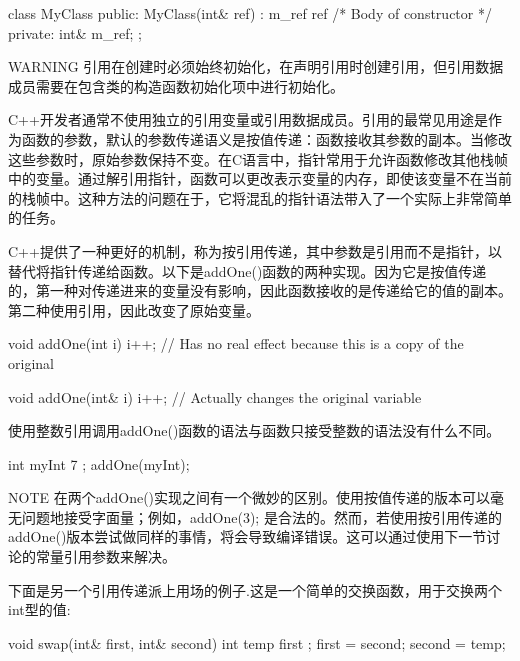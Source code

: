 \begin{cpp}
class MyClass
{
    public:
        MyClass(int& ref) : m_ref { ref } { /* Body of constructor */ }
    private:
        int& m_ref;
};
\end{cpp}

\begin{myWarning}{WARNING}
引用在创建时必须始终初始化，在声明引用时创建引用，但引用数据成员需要在包含类的构造函数初始化项中进行初始化。
\end{myWarning}


C++开发者通常不使用独立的引用变量或引用数据成员。引用的最常见用途是作为函数的参数，默认的参数传递语义是按值传递：函数接收其参数的副本。当修改这些参数时，原始参数保持不变。在C语言中，指针常用于允许函数修改其他栈帧中的变量。通过解引用指针，函数可以更改表示变量的内存，即使该变量不在当前的栈帧中。这种方法的问题在于，它将混乱的指针语法带入了一个实际上非常简单的任务。

C++提供了一种更好的机制，称为按引用传递，其中参数是引用而不是指针，以替代将指针传递给函数。以下是addOne()函数的两种实现。因为它是按值传递的，第一种对传递进来的变量没有影响，因此函数接收的是传递给它的值的副本。第二种使用引用，因此改变了原始变量。

\begin{cpp}
void addOne(int i)
{
    i++; // Has no real effect because this is a copy of the original
}

void addOne(int& i)
{
    i++; // Actually changes the original variable
}
\end{cpp}

使用整数引用调用addOne()函数的语法与函数只接受整数的语法没有什么不同。

\begin{cpp}
int myInt { 7 };
addOne(myInt);
\end{cpp}

\begin{myNotic}{NOTE}
在两个addOne()实现之间有一个微妙的区别。使用按值传递的版本可以毫无问题地接受字面量；例如，addOne(3); 是合法的。然而，若使用按引用传递的addOne()版本尝试做同样的事情，将会导致编译错误。这可以通过使用下一节讨论的常量引用参数来解决。
\end{myNotic}

下面是另一个引用传递派上用场的例子.这是一个简单的交换函数，用于交换两个int型的值:

\begin{cpp}
void swap(int& first, int& second)
{
    int temp { first };
    first = second;
    second = temp;
}
\end{cpp}

